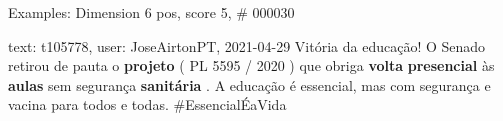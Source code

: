 \begin{frame}{Examples: Dimension 6 pos, score 5, \# 000030}
\footnotesize
\begin{exampleblock}{text: t105778, user: JoseAirtonPT, 2021-04-29}
Vitória da educação! O Senado retirou de pauta o \textbf{projeto} ( PL 5595 / 
2020 ) que obriga \textbf{volta} \textbf{presencial} às \textbf{aulas} sem 
segurança \textbf{sanitária} . A educação é essencial, mas com segurança e 
vacina para todos e todas. \#EssencialÉaVida 
\end{exampleblock}
\end{frame}
